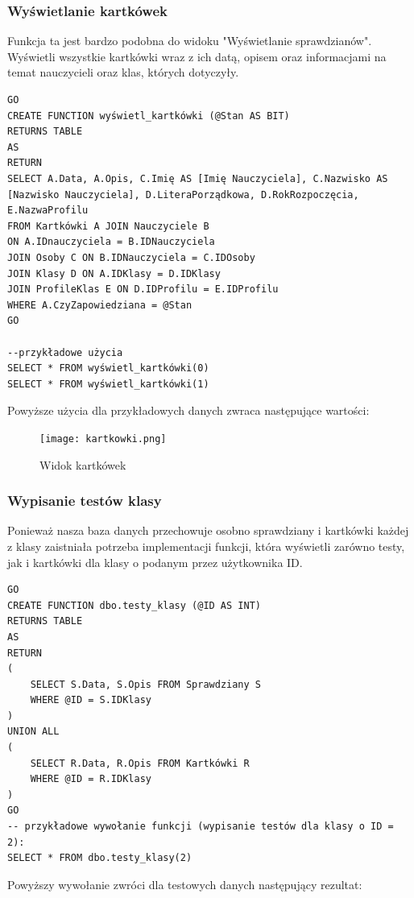 \documentclass[60pt]{article}
\begin{document}
\subsubsection{Wyświetlanie kartkówek}

Funkcja ta jest bardzo podobna do widoku "Wyświetlanie sprawdzianów". Wyświetli wszystkie kartkówki wraz z ich datą, opisem oraz informacjami na temat nauczycieli oraz klas, których dotyczyły.

\begin{verbatim}
GO
CREATE FUNCTION wyświetl_kartkówki (@Stan AS BIT)
RETURNS TABLE
AS
RETURN
SELECT A.Data, A.Opis, C.Imię AS [Imię Nauczyciela], C.Nazwisko AS [Nazwisko Nauczyciela], D.LiteraPorządkowa, D.RokRozpoczęcia, E.NazwaProfilu
FROM Kartkówki A JOIN Nauczyciele B
ON A.IDnauczyciela = B.IDNauczyciela
JOIN Osoby C ON B.IDNauczyciela = C.IDOsoby
JOIN Klasy D ON A.IDKlasy = D.IDKlasy
JOIN ProfileKlas E ON D.IDProfilu = E.IDProfilu
WHERE A.CzyZapowiedziana = @Stan
GO

--przykładowe użycia
SELECT * FROM wyświetl_kartkówki(0)
SELECT * FROM wyświetl_kartkówki(1)
\end{verbatim}

Powyższe użycia dla przykładowych danych zwraca następujące wartości:

\begin{figure}[h]
  \texttt{[image: kartkowki.png]}
  \caption{Widok kartkówek}
  \label{Widok kartkówek}
\end{figure}

\subsubsection{Wypisanie testów klasy}

Ponieważ nasza baza danych przechowuje osobno sprawdziany i kartkówki każdej z klasy zaistniała potrzeba implementacji funkcji, która wyświetli zarówno testy, jak i kartkówki dla klasy o podanym przez użytkownika ID. 

\begin{verbatim}
GO
CREATE FUNCTION dbo.testy_klasy (@ID AS INT)
RETURNS TABLE
AS
RETURN
(
    SELECT S.Data, S.Opis FROM Sprawdziany S
    WHERE @ID = S.IDKlasy
)
UNION ALL
(
    SELECT R.Data, R.Opis FROM Kartkówki R
    WHERE @ID = R.IDKlasy
)
GO
-- przykładowe wywołanie funkcji (wypisanie testów dla klasy o ID = 2):
SELECT * FROM dbo.testy_klasy(2)
\end{verbatim}

Powyższy wywołanie zwróci dla testowych danych następujący rezultat:
\end{document}

